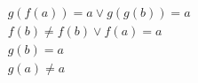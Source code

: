 \begin{align*}
%
& g(f(a)) = a \lor g(g(b)) = a
~\\~
& f(b)  \neq  f(b) \lor f(a) = a
~\\~
& g(b) = a
~\\~
& g(a)  \neq  a
%
\end{align*}
